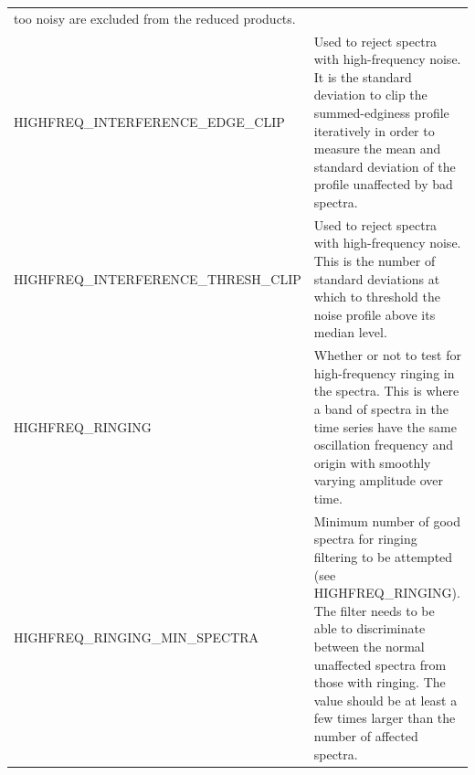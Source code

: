 \documentclass[11pt,oneside,chapters]{starlink}
\begin{document}
\begin{table}[t!]
\begin{small}
\begin{tabular}{|p{7.5cm}|p{8cm}|}
                         too noisy are excluded from the reduced products.\\
HIGHFREQ\_INTERFERENCE\_EDGE\_CLIP & Used to reject spectra with high-frequency noise.  It
                                     is the standard deviation to clip the summed-edginess
                                     profile iteratively in order to measure the mean and
                                     standard deviation of the profile unaffected by bad
                                     spectra.\\
HIGHFREQ\_INTERFERENCE\_THRESH\_CLIP & Used to reject spectra with high-frequency noise.
                                       This is the number of standard deviations at which
                                       to threshold the noise profile above its median level.\\
HIGHFREQ\_RINGING & Whether or not to test for high-frequency ringing in the spectra. This
                    is where a band of spectra in the time series have the same oscillation
                    frequency and origin with smoothly varying amplitude over time.\\
HIGHFREQ\_RINGING\_MIN\_SPECTRA & Minimum number of good spectra for ringing filtering to
                                  be attempted (see HIGHFREQ\_RINGING).  The filter needs
                                  to be able to discriminate between the normal unaffected
                                  spectra from those with ringing.  The value should be at
                                  least a few times larger than the number of affected
                                  spectra.\\
\hline
\end{tabular}
\end{small}
\end{table}


\newpage
\end{document}
